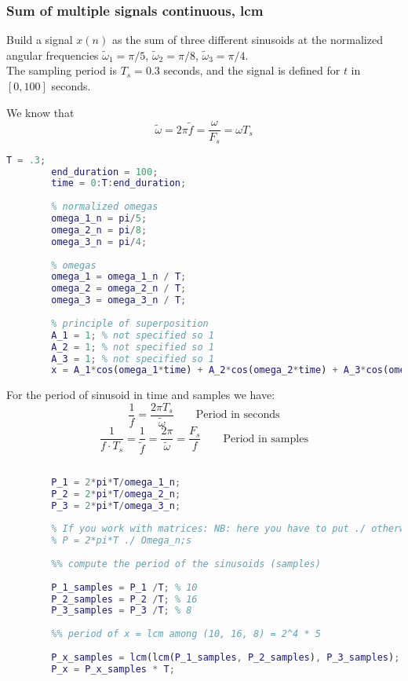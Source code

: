     \subsubsection{Sum of multiple signals continuous, lcm}
    Build a signal $x(n)$ as the sum of three different sinusoids  at the normalized angular frequencies $\tilde{\omega}_1=\pi/5$, $\tilde{\omega}_2=\pi/8$, $\tilde{\omega}_3=\pi/4$.\\
    The sampling period is $T_s = 0.3$ seconds, and  the signal is defined for $t$ in $[0, 100]$ seconds.

    We know that
    $$
    \tilde{\omega}=2\pi\tilde{f}=\frac{\omega}{F_s}=\omega T_s
    $$
    \begin{lstlisting}[language=Matlab, escapeinside=`']
        T = .3;
        end_duration = 100;
        time = 0:T:end_duration;
        
        % normalized omegas
        omega_1_n = pi/5; 
        omega_2_n = pi/8;
        omega_3_n = pi/4;
        
        % omegas 
        omega_1 = omega_1_n / T;
        omega_2 = omega_2_n / T;
        omega_3 = omega_3_n / T;
        
        % principle of superposition
        A_1 = 1; % not specified so 1
        A_2 = 1; % not specified so 1
        A_3 = 1; % not specified so 1
        x = A_1*cos(omega_1*time) + A_2*cos(omega_2*time) + A_3*cos(omega_3*time);
    \end{lstlisting}
    For the period of sinusoid in time and samples we have:
    $$
    \frac{1}{f}=\frac{2\pi T_s}{\tilde{\omega}}\qquad\text{Period in seconds}
    $$
    $$
    \frac{1}{f\cdot T_s}=\frac{1}{\tilde{f}}=\frac{2\pi}{\tilde{\omega}}=\frac{F_s}{f}\qquad\text{Period in samples}
    $$
    \begin{lstlisting}[language=Matlab, escapeinside=`']
        %% compute the period of the sinusoids (seconds)

        P_1 = 2*pi*T/omega_1_n;
        P_2 = 2*pi*T/omega_2_n;
        P_3 = 2*pi*T/omega_3_n;
        
        % If you work with matrices: NB: here you have to put ./ otherwise MATLAB reports an error.
        % P = 2*pi*T ./ Omega_n;s
        
        %% compute the period of the sinusoids (samples)
        
        P_1_samples = P_1 /T; % 10
        P_2_samples = P_2 /T; % 16
        P_3_samples = P_3 /T; % 8
        
        %% period of x = lcm among (10, 16, 8) = 2^4 * 5
        
        P_x_samples = lcm(lcm(P_1_samples, P_2_samples), P_3_samples);
        P_x = P_x_samples * T;
    \end{lstlisting}

